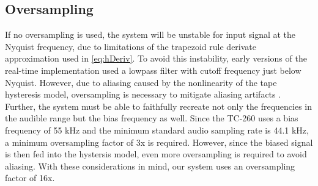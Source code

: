 \documentclass[twoside,a4paper]{article}
\begin{document}
\subsection{Oversampling}
If no oversampling is used, the system will be unstable
for input signal at the Nyquist frequency, due to limitations
of the trapezoid rule derivate approximation used in \cref{eq:hDeriv}.
To avoid this instability, early versions of the real-time
implementation used a lowpass filter with cutoff frequency
just below Nyquist. However, due to aliasing caused by the
nonlinearity of the tape hysteresis model, oversampling is
necessary to mitigate aliasing artifacts \cite{Yeh}. Further,
the system must be able to faithfully recreate not only the
frequencies in the audible range but the bias frequency as
well. Since the TC-260 uses a bias frequency of 55 kHz \cite{RefManual}
and the minimum standard audio sampling rate is 44.1 kHz,
a minimum oversampling factor of 3x is required. However,
since the biased signal is then fed into the hystersis model,
even more oversampling is required to avoid aliasing. With these
considerations in mind, our system uses an oversampling
factor of 16x.
\end{document}

